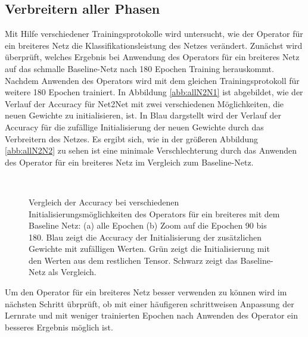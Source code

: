 \subsection{Verbreitern aller Phasen}
Mit Hilfe verschiedener Trainingsprotokolle wird untersucht, wie der Operator für ein breiteres Netz die Klassifikationsleistung des Netzes verändert.
Zunächst wird überprüft, welches Ergebnis bei Anwendung des Operators für ein breiteres Netz auf das schmalle Baseline-Netz nach 180 Epochen Training herauskommt. Nachdem Anwenden des Operators wird mit dem gleichen Trainingsprotokoll für weitere 180 Epochen trainiert. In Abbildung \ref{abb:allN2N1} ist abgebildet, wie der Verlauf der Accuracy für Net2Net mit zwei verschiedenen Möglichkeiten, die neuen Gewichte zu initialisieren, ist. In Blau dargstellt wird der Verlauf der Accuracy für die zufällige Initialisierung der neuen Gewichte durch das Verbreitern des Netzes.
Es ergibt sich, wie in der größeren Abbildung \ref{abb:allN2N2} zu sehen ist eine minimale Verschlechterung durch das Anwenden des Operator für ein breiteres Netz im Vergleich zum Baseline-Netz.
 \begin{figure}
     \centering
     \hfill
     \\
     \caption{Vergleich der Accuracy bei verschiedenen Initialisierungsmöglichkeiten des Operators für ein breiteres mit dem Baseline Netz: (a) alle Epochen (b) Zoom auf die Epochen 90 bis 180. Blau zeigt die Accuracy der Initialisierung der zusätzlichen Gewichte mit zufälligen Werten. Grün zeigt die Initialisierung mit den Werten aus dem restlichen Tensor. Schwarz zeigt das Baseline-Netz als Vergleich.}
     \label{abb:memory}
\end{figure}
Um den Operator für ein breiteres Netz besser verwenden zu können wird im nächsten Schritt übrprüft, ob mit einer häufigeren schrittweisen Anpassung der Lernrate und mit weniger trainierten Epochen nach Anwenden des Operator ein besseres Ergebnis möglich ist.


